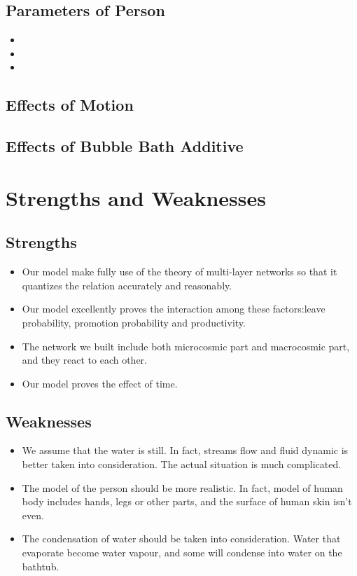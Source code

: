 \documentclass[12pt,a4paper,titlepage]{article}
\begin{document}
\subsection{Parameters of Person}
\label{sec:parameters of person}
\begin{itemize}
\item
\item
\item
\end{itemize}

\subsection{Effects of Motion}
\label{sec:effects of motion}

\subsection{Effects of Bubble Bath Additive}
\label{sec:effects of bubble bath additive}

\section{Strengths and Weaknesses}
\label{sec:strengths-and-weaknesses}

\subsection*{Strengths}
\label{sec:strengths}

\begin{itemize}
\item Our model make fully use of the theory of multi-layer networks so
  that it quantizes the relation accurately and reasonably.
\item Our model excellently proves the interaction among these
  factors:leave probability, promotion probability and productivity.
\item The network we built include both microcosmic part and
  macrocosmic part, and they react to each other.
\item Our model proves the effect of time.
\end{itemize}

\subsection*{Weaknesses}
\label{sec:weaknesses}

\begin{itemize}
\item We assume that the water is still. In fact, streams flow and fluid dynamic is better taken into consideration. The actual situation is much complicated.
\item The model of the person should be more realistic. In fact, model of human body includes hands, legs or other parts, and the surface of human skin isn't even.
\item The condensation of water should be taken into consideration. Water that evaporate become water vapour, and some will condense into water on the bathtub.
\end{itemize}
\end{document}

